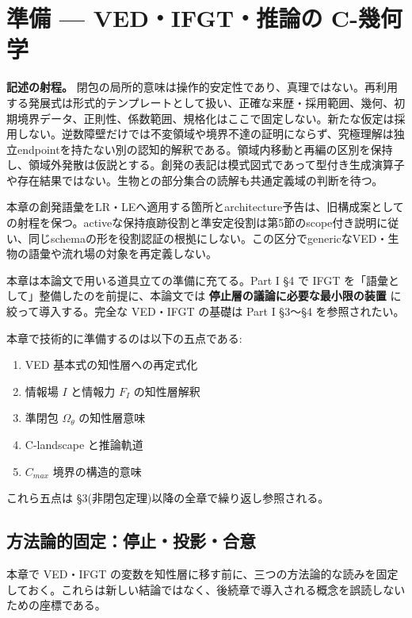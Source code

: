\section{準備 — VED・IFGT・推論の C-幾何学}

\noindent\textbf{記述の射程。} 閉包の局所的意味は操作的安定性であり、真理ではない。再利用する発展式は形式的テンプレートとして扱い、正確な来歴・採用範囲、幾何、初期境界データ、正則性、係数範囲、規格化はここで固定しない。新たな仮定は採用しない。逆数障壁だけでは不変領域や境界不達の証明にならず、究極理解は独立endpointを持たない別の認知的解釈である。領域内移動と再編の区別を保持し、領域外発散は仮説とする。創発の表記は模式図式であって型付き生成演算子や存在結果ではない。生物との部分集合の読解も共通定義域の判断を待つ。

本章の創発語彙をLR・LEへ適用する箇所とarchitecture予告は、旧構成案としての射程を保つ。activeな保持痕跡役割と準安定役割は第5節のscope付き説明に従い、同じschemaの形を役割認証の根拠にしない。この区分でgenericなVED・生物の語彙や流れ場の対象を再定義しない。



本章は本論文で用いる道具立ての準備に充てる。Part I \S{}4 で IFGT を「語彙として」整備したのを前提に、本論文では \textbf{停止層の議論に必要な最小限の装置} に絞って導入する。完全な VED・IFGT の基礎は Part I \S{}3〜\S{}4 を参照されたい。

本章で技術的に準備するのは以下の五点である:

\begin{enumerate}
\item VED 基本式の知性層への再定式化
\item 情報場 $I$ と情報力 $F_I$ の知性層解釈
\item 準閉包 $\Omega_\theta$ の知性層意味
\item C-landscape と推論軌道
\item $C_{max}$ 境界の構造的意味
\end{enumerate}


これら五点は \S{}3(非閉包定理)以降の全章で繰り返し参照される。

\bigskip

\subsection{方法論的固定：停止・投影・合意}

本章で VED・IFGT の変数を知性層に移す前に、三つの方法論的な読みを固定しておく。これらは新しい結論ではなく、後続章で導入される概念を誤読しないための座標である。

